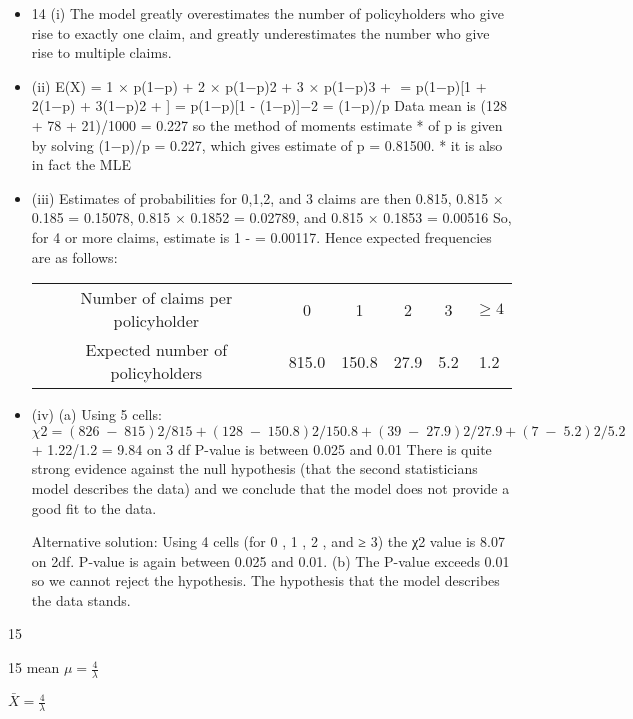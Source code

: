 \documentclass[a4paper,12pt]{article}
\begin{document}
\begin{itemize}
    \item 14 (i) The model greatly overestimates the number of policyholders who give
rise to exactly one claim, and greatly underestimates the number who give
rise to multiple claims.
\item (ii) E(X) = 1 × p(1−p) + 2 × p(1−p)2 + 3 × p(1−p)3 + 
= p(1−p)[1 + 2(1−p) + 3(1−p)2 + ] = p(1−p)[1 \;-\; (1−p)]−2 = (1−p)/p
Data mean is (128 + 78 + 21)/1000 = 0.227
so the method of moments estimate * of p is given by solving
(1−p)/p = 0.227, which gives estimate of p = 0.81500.
* it is also in fact the MLE
\item (iii) Estimates of probabilities for 0,1,2, and 3 claims are then 0.815,
0.815 × 0.185 = 0.15078, 0.815 × 0.1852 = 0.02789, and
0.815 × 0.1853 = 0.00516
So, for 4 or more claims, estimate is 1 \;- = 0.00117.
Hence expected frequencies are as follows:
\begin{tabular}{c|c|c|c|c|c|}
Number of claims per policyholder  & 0 & 1 & 2 & 3 & $\geq 4$ \\
Expected number of policyholders &  815.0 & 150.8 & 27.9 & 5.2&  1.2 \\ 
\end{tabular}

\item (iv) (a) Using 5 cells:
\[ χ2 = (826\;-\;815)2/815+(128\;-\;150.8)2/150.8+(39\;-\;27.9)2/27.9 +(7\;-\;5.2)2/5.2\]
+ 1.22/1.2 = 9.84 on 3 df
P-value is between 0.025 and 0.01
There is quite strong evidence against the null hypothesis (that the
second statisticians model describes the data) and we conclude that
the model does not provide a good fit to the data.
\item [Alternative solution: Using 4 cells (for 0 , 1 , 2 , and ≥ 3) the χ2 value
is 8.07 on 2df. P-value is again between 0.025 and 0.01.]
  (b) The P-value exceeds 0.01 so we cannot reject the hypothesis.
The hypothesis that the model describes the data stands.
\end{itemize}
15 





15 mean $\mu = \frac{4}{\lambda}$

$\bar{X} = \frac{4}{\lambda}$
\end{document}

